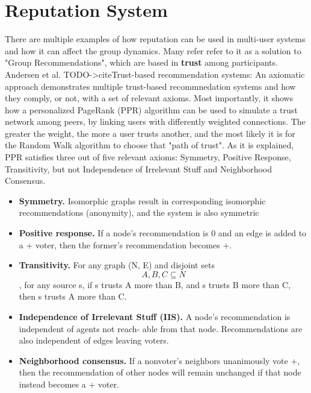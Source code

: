 \section{Reputation System}\label{sec:rep-sys-sota}

There are multiple examples of how reputation can be used in multi-user systems and how it can affect the group dynamics. Many refer refer to it as a solution to "Group Recommendations", which are based in \textbf{trust} among participants. Andersen et al. TODO->cite{Trust-based recommendation systems: An axiomatic approach} demonstrates multiple trust-based recommnedation systems and how they comply, or not, with a set of relevant axioms. Most importantly, it shows how a personalized PageRank (PPR) algorithm can be used to simulate a trust network among peers, by linking users with differently weighted connections. The greater the weight, the more a user trusts another, and the most likely it is for the Random Walk algorithm to choose that "path of trust". As it is explained, PPR satisfies three out of five relevant axioms: Symmetry, Positive Response, Transitivity, but not Independence of Irrelevant Stuff and Neighborhood Consensus.
\begin{itemize}
    \item \textbf{Symmetry.} Isomorphic graphs result in corresponding isomorphic recommendations (anonymity), and the system is also symmetric
    \item \textbf{Positive response.} If a node’s recommendation is 0 and an edge is added to a + voter, then the former’s recommendation becomes +.
    \item \textbf{Transitivity.} For any graph (N, E) and disjoint sets $$ A, B, C \subseteq N $$ , for any source s, if s trusts A more than B, and s trusts B more than C, then s trusts A more than C.
    \item \textbf{Independence of Irrelevant Stuﬀ (IIS).} A node’s recommendation is independent of agents not reach- able from that node. Recommendations are also independent of edges leaving voters.
    \item \textbf{Neighborhood consensus.} If a nonvoter’s neighbors unanimously vote +, then the recommendation of other nodes will remain unchanged if that node instead becomes a + voter.
\end{itemize}


